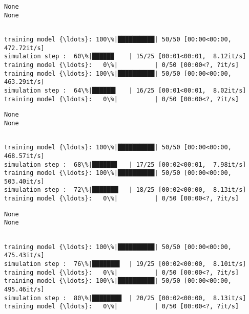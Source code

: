 \documentclass[11pt]{article}
\begin{document}
    \begin{Verbatim}[commandchars=\\\{\}]
None
None
    \end{Verbatim}

    \begin{Verbatim}[commandchars=\\\{\}]

training model {\ldots}: 100\%|██████████| 50/50 [00:00<00:00, 472.72it/s]
simulation step :  60\%|██████    | 15/25 [00:01<00:01,  8.12it/s]
training model {\ldots}:   0\%|          | 0/50 [00:00<?, ?it/s]
training model {\ldots}: 100\%|██████████| 50/50 [00:00<00:00, 463.29it/s]
simulation step :  64\%|██████▍   | 16/25 [00:01<00:01,  8.02it/s]
training model {\ldots}:   0\%|          | 0/50 [00:00<?, ?it/s]
    \end{Verbatim}

    \begin{Verbatim}[commandchars=\\\{\}]
None
None
    \end{Verbatim}

    \begin{Verbatim}[commandchars=\\\{\}]

training model {\ldots}: 100\%|██████████| 50/50 [00:00<00:00, 468.57it/s]
simulation step :  68\%|██████▊   | 17/25 [00:02<00:01,  7.98it/s]
training model {\ldots}: 100\%|██████████| 50/50 [00:00<00:00, 503.40it/s]
simulation step :  72\%|███████▏  | 18/25 [00:02<00:00,  8.13it/s]
training model {\ldots}:   0\%|          | 0/50 [00:00<?, ?it/s]
    \end{Verbatim}

    \begin{Verbatim}[commandchars=\\\{\}]
None
None
    \end{Verbatim}

    \begin{Verbatim}[commandchars=\\\{\}]

training model {\ldots}: 100\%|██████████| 50/50 [00:00<00:00, 475.43it/s]
simulation step :  76\%|███████▌  | 19/25 [00:02<00:00,  8.10it/s]
training model {\ldots}:   0\%|          | 0/50 [00:00<?, ?it/s]
training model {\ldots}: 100\%|██████████| 50/50 [00:00<00:00, 495.46it/s]
simulation step :  80\%|████████  | 20/25 [00:02<00:00,  8.13it/s]
training model {\ldots}:   0\%|          | 0/50 [00:00<?, ?it/s]
    \end{Verbatim}
\end{document}
